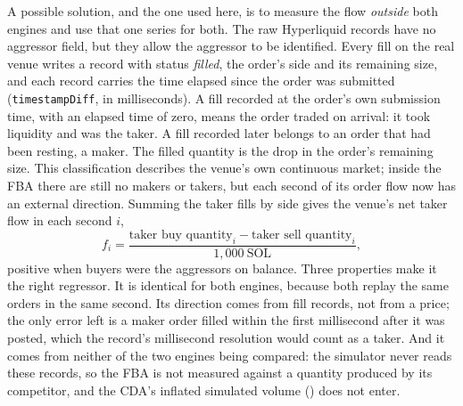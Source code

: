 A possible solution, and the one used here, is to measure the flow
\emph{outside} both engines and use that one series for both. The raw Hyperliquid records have no aggressor
field, but they allow the aggressor to be identified. Every fill on the
real venue writes a record with status \emph{filled}, the order's side
and its remaining size, and each record carries the time elapsed since
the order was submitted (\texttt{timestampDiff}, in milliseconds). A
fill recorded at the order's own submission time, with an elapsed time
of zero, means the order traded on arrival: it took liquidity and was
the taker. A fill recorded later belongs to an order that had been
resting, a maker. The filled quantity is the drop in the order's
remaining size. This classification describes the venue's own continuous
market; inside the FBA there are still no makers or takers, but each
second of its order flow now has an external direction. Summing the taker fills by side gives the venue's net
taker flow in each second $i$,
\begin{equation}
  \label{eq:kylef}
  f_i = \frac{\text{taker buy quantity}_i - \text{taker sell quantity}_i}{1{,}000\ \text{SOL}},
\end{equation}
positive when buyers were the aggressors on balance. Three properties
make it the right regressor. It is identical for both engines, because
both replay the same orders in the same second. Its direction comes from
fill records, not from a price; the only error left is a maker order
filled within the first millisecond after it was posted, which the record's
millisecond resolution would count as a taker. And it comes from neither
of the two engines being compared: the simulator never reads these
records, so the FBA is not measured against a quantity produced by its
competitor, and the CDA's inflated simulated volume
() does not enter.

